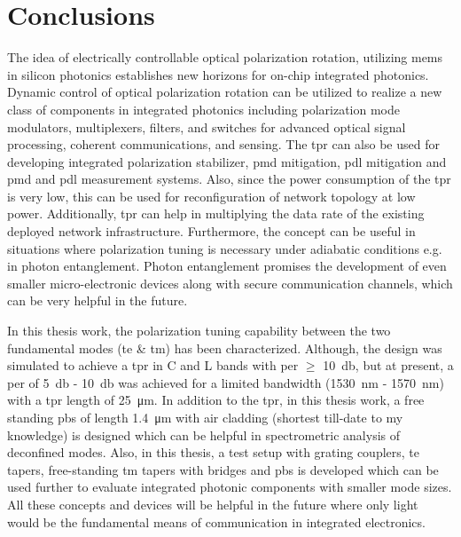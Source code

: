 \documentclass[../report.tex]{subfiles}
\begin{document}
		
\chapter{Conclusions}

The idea of electrically controllable optical polarization rotation, utilizing \gls{mems} in silicon photonics establishes new horizons for on-chip integrated photonics. Dynamic control of optical polarization rotation can be utilized to realize a new class of components in integrated photonics including polarization mode modulators, multiplexers, filters, and switches for advanced optical signal processing, coherent communications, and sensing. The \gls{tpr} can also be used for developing integrated polarization stabilizer, \gls{pmd} mitigation, \gls{pdl} mitigation and \gls{pmd} and \gls{pdl} measurement systems. Also, since the power consumption of the \gls{tpr} is very low, this can be used for reconfiguration of network topology at low power. Additionally, \gls{tpr} can help in multiplying the data rate of the existing deployed network infrastructure. Furthermore, the concept can be useful in situations where polarization tuning is necessary under adiabatic conditions e.g. in photon entanglement. Photon entanglement promises the development of even smaller micro-electronic devices along with secure communication channels, which can be very helpful in the future. \par 

In this thesis work, the polarization tuning capability between the two fundamental modes (\gls{te} \& \gls{tm}) has been characterized. Although, the design was simulated to achieve a \gls{tpr} in C and L bands with \gls{per} $\geq$ \SI{10}{\decibel}, but at present, a \gls{per} of \SI{5}{\decibel} - \SI{10}{\decibel} was achieved for a limited bandwidth (\SI{1530}{\nano \meter} - \SI{1570}{\nano \meter}) with a \gls{tpr} length of \SI{25}{\micro \meter}. In addition to the \gls{tpr}, in this thesis work, a free standing \gls{pbs} of length \SI{1.4}{\micro \meter} with air cladding (shortest till-date to my knowledge) is designed which can be helpful in spectrometric analysis of deconfined modes. Also, in this thesis, a test setup with grating couplers, \gls{te} tapers, free-standing \gls{tm} tapers with bridges and \gls{pbs} is developed which can be used further to evaluate integrated photonic components with smaller mode sizes. All these concepts and devices will be helpful in the future where only light would be the fundamental means of communication in integrated electronics.
\end{document}
